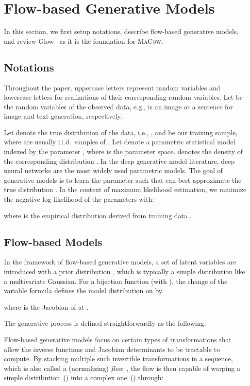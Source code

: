 \documentclass{article}
\begin{document}
\section{Flow-based Generative Models}\label{sec:background}
In this section, we first setup notations, describe flow-based generative models, and review Glow~\citep{kingma2018glow} as it is the foundation for \textsc{MaCow}.

\subsection{Notations}
Throughout the paper, uppercase letters represent random variables and lowercase letters for realizations of their corresponding random variables.
Let  be the random variables of the observed data, e.g.,  is an image or a sentence for image and text generation, respectively.

Let  denote the true distribution of the data, i.e., , and  be our training sample, where 
are usually i.i.d.\ samples of .
Let  denote a parametric statistical model indexed by the parameter , where  is the parameter space.
 denotes the density of the corresponding distribution .
In the deep generative model literature, deep neural networks are the most widely used parametric models.
The goal of generative models is to learn the parameter  such that  can best approximate the true distribution .
In the context of maximum likelihood estimation, we minimize the negative log-likelihood of the parameters with:

where  is the empirical distribution derived from training data .

\subsection{Flow-based Models}
In the framework of flow-based generative models, a set of latent variables  are introduced with a prior distribution , which is typically a simple distribution like a multivariate Gaussian.
For a bijection function  (with ), the change of the variable formula defines the model distribution on  by

where  is the Jacobian of  at .

The generative process is defined straightforwardly as the following:

Flow-based generative models focus on certain types of transformations  that allow the inverse functions  and Jacobian determinants to be tractable to compute.
By stacking multiple such invertible transformations in a sequence, which is also called a (normalizing) \emph{flow}~\citep{rezende2015variational}, the flow is then capable of warping a simple distribution~() into a complex one~() through:
\end{document}
